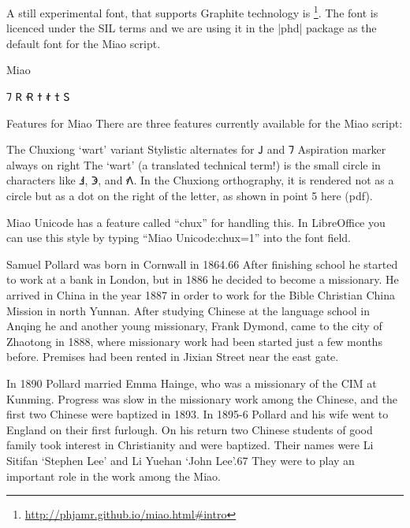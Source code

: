 A still experimental font, that supports Graphite technology is \footnote{\url{http://phjamr.github.io/miao.html\#intro}}. The font is licenced under the SIL terms and we are using it in the |phd| package as the default font for the Miao script.



\begin{scriptexample}[]{Miao}
\end{scriptexample}

{\LARGE\miao 𖼴	𖼵	𖼶	𖼷	𖼸	𖼹	𖼺	}

Features for Miao
There are three features currently available for the Miao script:


The Chuxiong ‘wart’ variant
Stylistic alternates for {\miao 𖼳} and {\miao 𖼴}
Aspiration marker always on right
The ‘wart’ (a translated technical term!) is the small circle in characters like {\miao 𖼁, 𖼅}, and {\miao 𖼾}. In the Chuxiong orthography, it is rendered not as a circle but as a dot on the right of the letter, as shown in point 5 here (pdf).

Miao Unicode has a feature called “chux” for handling this. In LibreOffice you can use this style by typing “Miao Unicode:chux=1” into the font field.


Samuel Pollard was born in Cornwall in 1864.66 After finishing school he
started to work at a bank in London, but in 1886 he decided to become a
missionary. He arrived in China in the year 1887 in order to work for the
Bible Christian China Mission in north Yunnan. After studying Chinese at
the language school in Anqing he and another young missionary, Frank
Dymond, came to the city of Zhaotong in 1888, where missionary work
had been started just a few months before. Premises had been rented in
Jixian Street near the east gate.

In 1890 Pollard married Emma Hainge, who was a missionary of the
CIM at Kunming. Progress was slow in the missionary work among the
Chinese, and the first two Chinese were baptized in 1893. In 1895-6
Pollard and his wife went to England on their first furlough. On his return
two Chinese students of good family took interest in Christianity and were
baptized. Their names were Li Sitifan ‘Stephen Lee’ and Li Yuehan
‘John Lee’.67 They were to play an important role in the work
among the Miao.









